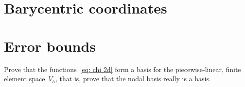 \section{Barycentric coordinates}\label{sec: barycentric}

\section{Error bounds}

\begin{Exercises}

\exercise\label{ex: nodal basis}
Prove that the functions~\eqref{eq: chi 2d} form a basis for the 
piecewise-linear, finite element space~$V_h$, that is, prove that the nodal 
basis really is a basis. 
\end{Exercises}
